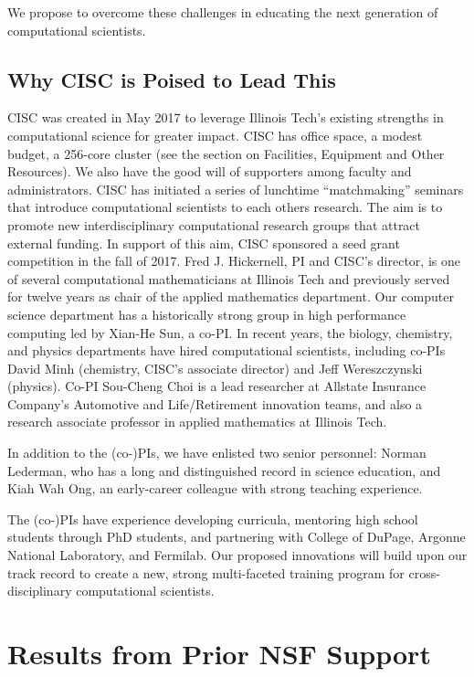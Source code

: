 \documentclass[11pt]{NSFamsart}
\begin{document}
We propose to overcome these challenges in educating the next generation of computational scientists.

\subsection*{Why CISC is Poised to Lead This}
CISC was created in May 2017 to leverage Illinois Tech's existing strengths in computational science for greater impact.  CISC has office space, a modest budget, a 256-core cluster (see the section on Facilities, Equipment and Other Resources).  We also have the good will of supporters among faculty and administrators.  CISC has initiated a series of lunchtime ``matchmaking'' seminars that introduce computational scientists to each others research.  The aim is to promote new interdisciplinary computational research groups that attract external funding. In support of this aim, CISC sponsored a seed grant competition in the fall of 2017. Fred J. Hickernell, PI and CISC’s director, is one of several computational mathematicians at Illinois Tech and previously served for twelve years as chair of the applied mathematics department.  Our computer science department has a historically strong group in high performance computing led by Xian-He Sun, a co-PI.  In recent years, the biology, chemistry, and physics departments have hired computational scientists, including co-PIs David Minh (chemistry, CISC's associate director) and Jeff Wereszczynski (physics).  Co-PI Sou-Cheng Choi is a lead researcher at Allstate Insurance Company's Automotive and Life/Retirement innovation teams, and also a research associate professor in applied mathematics at Illinois Tech.

In addition to the (co-)PIs, we have enlisted two senior personnel:  Norman Lederman, who has a long and distinguished record in science education, and Kiah Wah Ong, an early-career colleague with strong teaching experience.

The (co-)PIs have experience developing curricula, mentoring high school students through PhD students, and partnering with College of DuPage, Argonne National Laboratory, and Fermilab.  Our proposed innovations will build upon our track record to create a new, strong multi-faceted training program for cross-disciplinary computational scientists.

\section{Results from Prior NSF Support}
\end{document}
